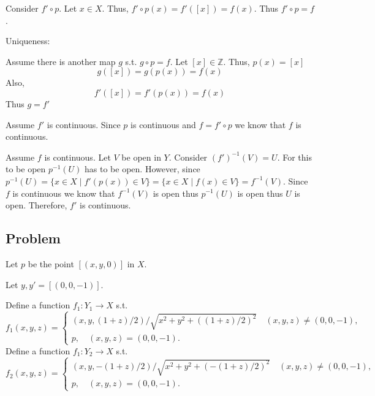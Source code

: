 \documentclass[12pt, letterpaper]{article}
\newcounter{problem}
\newcommand{\q}{
    \newpage %
    \stepcounter{problem} %
    \subsection*{Problem \arabic{problem}} %
}
\newcommand{\Z}{\mathbb{Z}}
\begin{document}
Consider $f' \circ p$. Let $x \in X$. Thus, $f' \circ p(x)= f'([x])=f(x)$. Thus $f' \circ p = f$.

Uniqueness:

Assume there is another map $g$ s.t. $g \circ p = f$. Let $[x] \in \Z$. Thus, $p(x)=[x]$
\[g([x])=g(p(x))=f(x)\]
Also,
\[f'([x])=f'(p(x))=f(x)\]
Thus $g=f'$

Assume $f'$ is continuous. Since $p$ is continuous and $f=f' \circ p$ we know that $f$ is continuous.

Assume $f$ is continuous. Let $V$ be open in $Y$. Consider $(f')^{-1}(V)=U$. For this to be open $p^{-1}(U)$ has to be open. However, since $p^{-1}(U)=\{x \in X \mid f'(p(x)) \in V\}=\{x \in X \mid f(x) \in V\}=f^{-1}(V)$. Since $f$ is continuous we know that $f^{-1}(V)$ is open thus $p^{-1}(U)$ is open thus $U$ is open. Therefore, $f'$ is continuous.

\q
Let $p$ be the point $[(x,y,0)]$ in $X$.

Let $y,y'=[(0,0,-1)]$.

Define a function $f_1: Y_1 \to X$ s.t. 
\begin{equation*}
    f_1(x,y,z)=\begin{cases}
        (x,y,(1+z)/2)/\sqrt{x^2+y^2+((1+z)/2)^2} \quad (x,y,z)\neq (0,0,-1),\\
        p, \quad (x,y,z) = (0,0,-1).
    \end{cases}
\end{equation*}
Define a function $f_1: Y_2 \to X$ s.t. 
    \begin{equation*}
        f_2(x,y,z)=\begin{cases}
            (x,y,-(1+z)/2)/\sqrt{x^2+y^2+(-(1+z)/2)^2} \quad (x,y,z)\neq (0,0,-1),\\
        p, \quad (x,y,z) = (0,0,-1).
        \end{cases}
    \end{equation*}
\end{document}
